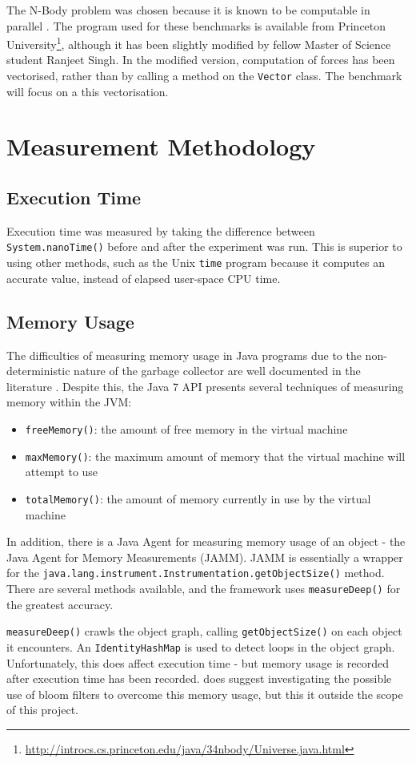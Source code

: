 	The N-Body problem was chosen because it is known to be computable in parallel \citep{Warren1993,Nyland2007}. The program used for these benchmarks is available from Princeton University\footnote{\url{http://introcs.cs.princeton.edu/java/34nbody/Universe.java.html}}, although it has been slightly modified by fellow Master of Science student Ranjeet Singh. In the modified version, computation of forces has been vectorised, rather than by calling a method on the \texttt{Vector} class. The benchmark will focus on a this vectorisation.
	
\section{Measurement Methodology} \label{sec:methodology/measurements}
	\subsection{Execution Time} \label{sec:methodology/measurements/time}
	Execution time was measured by taking the difference between \texttt{System.nanoTime()} before and after the experiment was run. This is superior to using other methods, such as the Unix \texttt{time} program because it computes an accurate value, instead of elapsed user-space CPU time.
	
	\subsection{Memory Usage} \label{sec:methodology/measurements/memory}
	The difficulties of measuring memory usage in Java programs due to the non-deterministic nature of the garbage collector are well documented in the literature \citep{Kim2000,Ogata2010}. Despite this, the Java 7 API presents several techniques \citep{RuntimeDocs} of measuring memory within the JVM:
	
	\begin{itemize}
		\item \texttt{freeMemory()}: the amount of free memory in the virtual machine
		\item \texttt{maxMemory()}: the maximum amount of memory that the virtual machine will attempt to use
		\item \texttt{totalMemory()}: the amount of memory currently in use by the virtual machine
	\end{itemize}
	
	In addition, there is a Java Agent for measuring memory usage of an object - the Java Agent for Memory Measurements \citep{JAMM} (JAMM). JAMM is essentially a wrapper for the \texttt{java.lang.instrument.Instrumentation.getObjectSize()} method. There are several methods available, and the framework uses \texttt{measureDeep()} for the greatest accuracy.
	
	\texttt{measureDeep()} crawls the object graph, calling \texttt{getObjectSize()} on each object it encounters. An \texttt{IdentityHashMap} is used to detect loops in the object graph. Unfortunately, this does affect execution time - but memory usage is recorded after execution time has been recorded. \citeauthor{JAMM} does suggest investigating the possible use of bloom filters to overcome this memory usage, but this it outside the scope of this project.